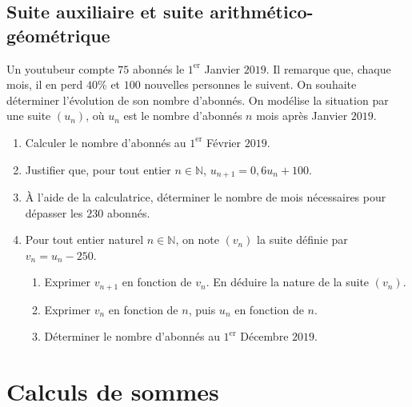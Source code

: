 \documentclass[11pt]{article}
\begin{document}
\subsection{Suite auxiliaire et suite arithmético-géométrique}
\begin{app}
  Un youtubeur compte $75$ abonnés le $1^\text{er}$ Janvier $2019$. Il remarque
  que, chaque mois, il en perd $40$\% et $100$ nouvelles personnes le suivent.
  On souhaite déterminer l'évolution de son nombre d'abonnés. On modélise la
  situation par une suite $\left( u_n \right)$, où $u_n$ est le nombre d'abonnés
  $n$ mois après Janvier $2019$.
  \begin{enumerate}
    \item Calculer le nombre d'abonnés au $1^\text{er}$ Février $2019$.
    \item Justifier que, pour tout entier $n\in\mathbb{N}$,
      $u_{n+1}=0,6u_n+100$.
    \item À l'aide de la calculatrice, déterminer le nombre de mois nécessaires
      pour dépasser les $230$ abonnés.
    \item Pour tout entier naturel $n\in\mathbb{N}$, on note $\left( v_n
      \right)$ la suite définie par $v_n = u_n-250$.
      \begin{enumerate}
        \item Exprimer $v_{n+1}$ en fonction de $v_n$. En déduire la nature de
          la suite $\left( v_n \right)$.
        \item Exprimer $v_n$ en fonction de $n$, puis $u_n$ en fonction de $n$.
        \item Déterminer le nombre d'abonnés au $1^\text{er}$ Décembre $2019$.
      \end{enumerate}
  \end{enumerate}
\end{app}

\section{Calculs de sommes}
\end{document}

